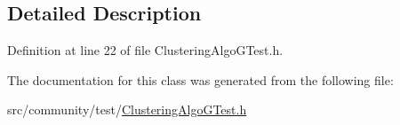 \subsection{Detailed Description}


Definition at line 22 of file Clustering\-Algo\-G\-Test.\-h.



The documentation for this class was generated from the following file\-:\begin{DoxyCompactItemize}
\item 
src/community/test/\hyperlink{_clustering_algo_g_test_8h}{Clustering\-Algo\-G\-Test.\-h}\end{DoxyCompactItemize}
